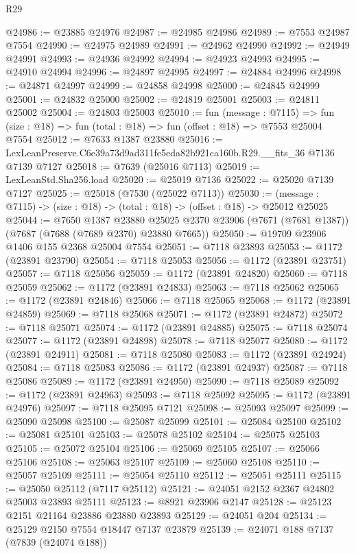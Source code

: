 \begin{lexlean}{R29}
\begin{coremodule}
@24986 := @23885 @24976
@24987 := @24985 @24986
@24989 := @7553 @24987 @7554
@24990 := @24975 @24989
@24991 := @24962 @24990
@24992 := @24949 @24991
@24993 := @24936 @24992
@24994 := @24923 @24993
@24995 := @24910 @24994
@24996 := @24897 @24995
@24997 := @24884 @24996
@24998 := @24871 @24997
@24999 := @24858 @24998
@25000 := @24845 @24999
@25001 := @24832 @25000
@25002 := @24819 @25001
@25003 := @24811 @25002
@25004 := @24803 @25003
@25010 := fun (message : @7115) =>
  fun (size : @18) => fun (total : @18) => fun (offset : @18) => @7553 @25004 @7554
@25012 := @7633 @1387 @23880
@25016 := LexLeanPreserve.C6e39a73d9ad311fe5eda82b921ca160b.R29.__fits_36 @7136 @7139 @7127
@25018 := @7639 (@25016 @7113)
@25019 := LexLeanStd.Sha256.load
@25020 := @25019 @7136
@25022 := @25020 @7139 @7127
@25025 := @25018 (@7530 (@25022 @7113))
@25030 := (message : @7115) -> (size : @18) -> (total : @18) -> (offset : @18) -> @25012 @25025
@25044 := @7650
    @1387
    @23880
    @25025
    @2370
    @23906
    (@7671 (@7681 @1387))
    (@7687 (@7688 (@7689 @2370) @23880 @7665))
@25050 := @19709 @23906 @1406 @155 @2368 @25004 @7554
@25051 := @7118 @23893
@25053 := @1172 (@23891 @23790)
@25054 := @7118 @25053
@25056 := @1172 (@23891 @23751)
@25057 := @7118 @25056
@25059 := @1172 (@23891 @24820)
@25060 := @7118 @25059
@25062 := @1172 (@23891 @24833)
@25063 := @7118 @25062
@25065 := @1172 (@23891 @24846)
@25066 := @7118 @25065
@25068 := @1172 (@23891 @24859)
@25069 := @7118 @25068
@25071 := @1172 (@23891 @24872)
@25072 := @7118 @25071
@25074 := @1172 (@23891 @24885)
@25075 := @7118 @25074
@25077 := @1172 (@23891 @24898)
@25078 := @7118 @25077
@25080 := @1172 (@23891 @24911)
@25081 := @7118 @25080
@25083 := @1172 (@23891 @24924)
@25084 := @7118 @25083
@25086 := @1172 (@23891 @24937)
@25087 := @7118 @25086
@25089 := @1172 (@23891 @24950)
@25090 := @7118 @25089
@25092 := @1172 (@23891 @24963)
@25093 := @7118 @25092
@25095 := @1172 (@23891 @24976)
@25097 := @7118 @25095 @7121
@25098 := @25093 @25097
@25099 := @25090 @25098
@25100 := @25087 @25099
@25101 := @25084 @25100
@25102 := @25081 @25101
@25103 := @25078 @25102
@25104 := @25075 @25103
@25105 := @25072 @25104
@25106 := @25069 @25105
@25107 := @25066 @25106
@25108 := @25063 @25107
@25109 := @25060 @25108
@25110 := @25057 @25109
@25111 := @25054 @25110
@25112 := @25051 @25111
@25115 := @25050 @25112 (@7117 @25112)
@25121 := @24051 @2152 @2367 @24802 @25003 @23893 @25111
@25123 := @8921 @23906 @2147
@25128 := @25123 @2151 @21164 @23886 @23880 @23893
@25129 := @24051 @204
@25134 := @25129 @2150 @7554 @18447 @7137 @23879
@25139 := @24071 @188 @7137 (@7839 (@24074 @188))

\end{coremodule}
\end{lexlean}
